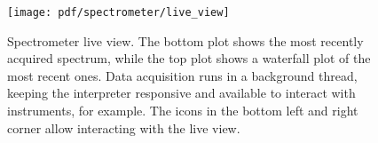\begin{figure}
    \centering
    \texttt{[image: pdf/spectrometer/live\_view]}
    \caption[Spectrometer live view]{
        Spectrometer live view.
        The bottom plot shows the most recently acquired spectrum, while the top plot shows a waterfall plot of the most recent ones.
        Data acquisition runs in a background thread, keeping the interpreter responsive and available to interact with instruments, for example.
        The icons in the bottom left and right corner allow interacting with the live view.
    }
    \label{fig:speck:software:live_view}
\end{figure}
